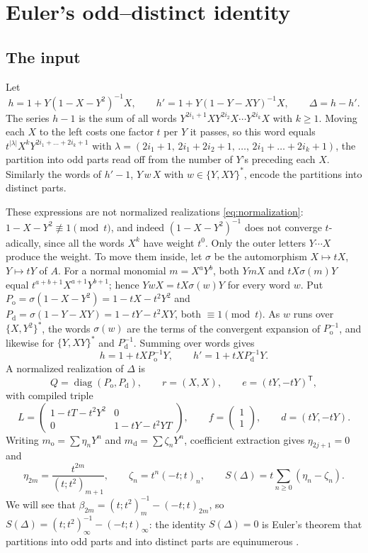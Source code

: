 \documentclass[11pt,a4paper]{article}
\theoremstyle{plain}
\theoremstyle{definition}
\theoremstyle{remark}
\begin{document}
\section{Euler's odd--distinct identity}\label{sec:euler}

\subsection{The input}
Let
\[
  h=1+Y(1-X-Y^2)^{-1}X,\qquad h'=1+Y(1-Y-XY)^{-1}X,\qquad\Delta=h-h'.
\]
The series $h-1$ is the sum of all words
$Y^{2i_1+1}XY^{2i_2}X\cdots Y^{2i_k}X$ with $k\ge1$. Moving each $X$ to the left
costs one factor $t$ per $Y$ it passes, so this word equals
$t^{|\lambda|}X^kY^{2i_1+\dots+2i_k+1}$ with
$\lambda=(2i_1+1,\,2i_1+2i_2+1,\,\dots,\,2i_1+\dots+2i_k+1)$, the partition into
odd parts read off from the number of $Y$'s preceding each $X$. Similarly the
words of $h'-1$, $Y\,w\,X$ with $w\in\{Y,XY\}^*$, encode the partitions into
distinct parts.

These expressions are not normalized realizations
\eqref{eq:normalization}: $1-X-Y^2\not\equiv1\pmod t$, and indeed
$(1-X-Y^2)^{-1}$ does not converge $t$-adically, since all the words $X^k$ have
weight $t^0$. Only the outer letters $Y\cdots X$ produce the weight. To move
them inside, let $\sigma$ be the automorphism $X\mapsto tX$, $Y\mapsto tY$ of
$A$. For a normal monomial $m=X^aY^b$, both $YmX$ and $tX\sigma(m)Y$ equal
$t^{a+b+1}X^{a+1}Y^{b+1}$; hence $YwX=tX\sigma(w)Y$ for every word $w$. Put
$P_{\mathrm o}=\sigma(1-X-Y^2)=1-tX-t^2Y^2$ and
$P_{\mathrm d}=\sigma(1-Y-XY)=1-tY-t^2XY$, both $\equiv1\pmod t$. As $w$
runs over $\{X,Y^2\}^*$, the words $\sigma(w)$ are the terms of the convergent
expansion of $P_{\mathrm o}^{-1}$, and likewise for $\{Y,XY\}^*$ and
$P_{\mathrm d}^{-1}$. Summing over words gives
\[
  h=1+tXP_{\mathrm o}^{-1}Y,\qquad h'=1+tXP_{\mathrm d}^{-1}Y.
\]
A normalized realization of $\Delta$ is
\[
  Q=\operatorname{diag}(P_{\mathrm o},P_{\mathrm d}),\qquad r=(X,X),\qquad e=(tY,-tY)^{\mathsf T},
\]
with compiled triple
\begin{equation}\label{eq:euler-triple}
  L=\begin{pmatrix}1-tT-t^2Y^2&0\\0&1-tY-t^2YT\end{pmatrix},\qquad
  f=\begin{pmatrix}1\\1\end{pmatrix},\qquad d=(tY,-tY).
\end{equation}
Writing $m_{\mathrm o}=\sum\eta_nY^n$ and $m_{\mathrm d}=\sum\zeta_nY^n$, coefficient
extraction gives $\eta_{2j+1}=0$ and
\[
  \eta_{2m}=\frac{t^{2m}}{(t;t^2)_{m+1}},\qquad
  \zeta_n=t^n(-t;t)_n,\qquad
  S(\Delta)=t\sum_{n\ge0}(\eta_n-\zeta_n).
\]
We will see that $\beta_{2m}=(t;t^2)_m^{-1}-(-t;t)_{2m}$, so
$S(\Delta)=(t;t^2)_\infty^{-1}-(-t;t)_\infty$: the identity $S(\Delta)=0$ is
Euler's theorem that partitions into odd parts and into distinct parts are
equinumerous \cite[26.10]{DLMF}.
\end{document}
